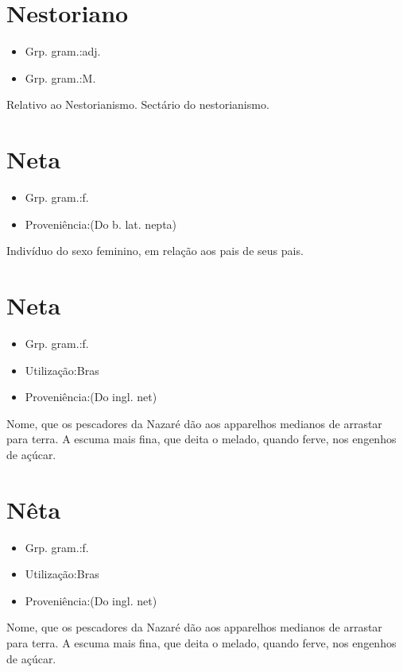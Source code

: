 \section{Nestoriano}
\begin{itemize}
\item {Grp. gram.:adj.}
\end{itemize}
\begin{itemize}
\item {Grp. gram.:M.}
\end{itemize}
Relativo ao Nestorianismo.
Sectário do nestorianismo.
\section{Neta}
\begin{itemize}
\item {Grp. gram.:f.}
\end{itemize}
\begin{itemize}
\item {Proveniência:(Do b. lat. \textunderscore nepta\textunderscore )}
\end{itemize}
Indivíduo do sexo feminino, em relação aos pais de seus pais.
\section{Neta}
\begin{itemize}
\item {Grp. gram.:f.}
\end{itemize}
\begin{itemize}
\item {Utilização:Bras}
\end{itemize}
\begin{itemize}
\item {Proveniência:(Do ingl. \textunderscore net\textunderscore )}
\end{itemize}
Nome, que os pescadores da Nazaré dão aos apparelhos medianos de arrastar para terra.
A escuma mais fina, que deita o melado, quando ferve, nos engenhos de açúcar.
\section{Nêta}
\begin{itemize}
\item {Grp. gram.:f.}
\end{itemize}
\begin{itemize}
\item {Utilização:Bras}
\end{itemize}
\begin{itemize}
\item {Proveniência:(Do ingl. \textunderscore net\textunderscore )}
\end{itemize}
Nome, que os pescadores da Nazaré dão aos apparelhos medianos de arrastar para terra.
A escuma mais fina, que deita o melado, quando ferve, nos engenhos de açúcar.

